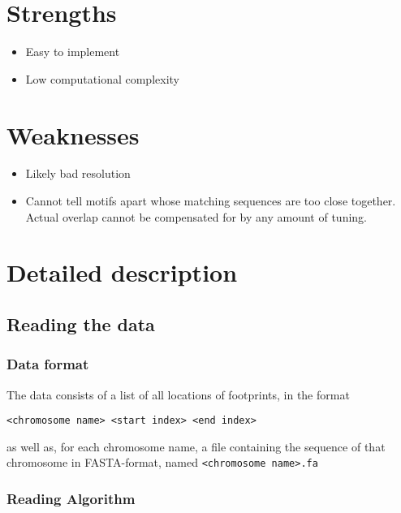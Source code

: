 \documentclass[fleqn]{book}
\providecommand{\tightlist}{%
  \setlength{\itemsep}{0pt}\setlength{\parskip}{0pt}}
\begin{document}
\section{Strengths}\label{strengths}

\begin{itemize}
\tightlist
\item
  Easy to implement
\item
  Low computational complexity
\end{itemize}

\section{Weaknesses}\label{weaknesses}

\begin{itemize}
\tightlist
\item
  Likely bad resolution
\item
  Cannot tell motifs apart whose matching sequences are too close
  together. Actual overlap cannot be compensated for by any amount of
  tuning.
\end{itemize}

\section{Detailed description}\label{detailed-description}

\subsection{Reading the data}\label{reading-the-data}

\subsubsection{Data format}\label{data-format-1}

The data consists of a list of all locations of footprints, in the
format

\begin{verbatim}
<chromosome name> <start index> <end index>
\end{verbatim}

as well as, for each chromosome name, a file containing the sequence of
that chromosome in FASTA-format, named
\texttt{\textless{}chromosome\ name\textgreater{}.fa}

\subsubsection{Reading Algorithm}\label{reading-algorithm}
\end{document}
